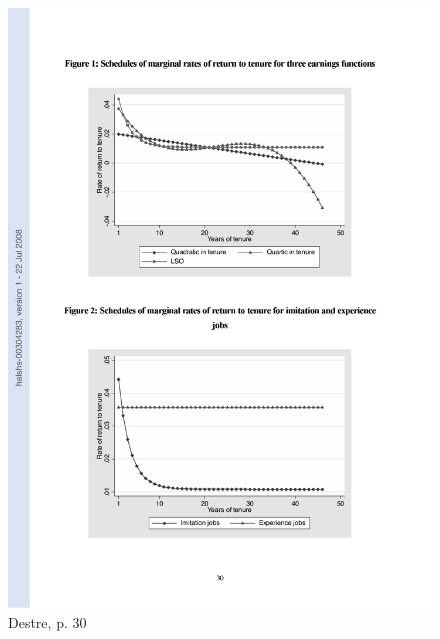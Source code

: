\documentclass[12pt,a4paper]{article}
\begin{document}
  \begin{figure}[ht]
        \centering
        \includegraphics[width=12cm]{dest_1.pdf}
        \caption{Destre, p. 30}
        \label{dest_1}
  \end{figure}


\end{document}
